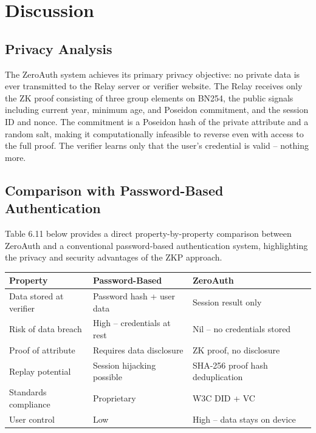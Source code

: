 \section{Discussion}

\subsection{Privacy Analysis}

The ZeroAuth system achieves its primary privacy objective: no private data is ever transmitted to the Relay server or verifier website. The Relay receives only the ZK proof consisting of three group elements on BN254, the public signals including current year, minimum age, and Poseidon commitment, and the session ID and nonce. The commitment is a Poseidon hash of the private attribute and a random salt, making it computationally infeasible to reverse even with access to the full proof. The verifier learns only that the user's credential is valid -- nothing more.

\subsection{Comparison with Password-Based Authentication}

Table 6.11 below provides a direct property-by-property comparison between ZeroAuth and a conventional password-based authentication system, highlighting the privacy and security advantages of the ZKP approach.

\begin{table}[H]
\begin{tabular}{|p{4cm}|p{4cm}|p{4cm}|}
\hline
\textbf{Property} & \textbf{Password-Based} & \textbf{ZeroAuth} \\
\hline
Data stored at verifier & Password hash + user data & Session result only \\
Risk of data breach & High -- credentials at rest & Nil -- no credentials stored \\
Proof of attribute & Requires data disclosure & ZK proof, no disclosure \\
Replay potential & Session hijacking possible & SHA-256 proof hash deduplication \\
Standards compliance & Proprietary & W3C DID + VC \\
User control & Low & High -- data stays on device \\
\hline
\end{tabular}
\end{table}

